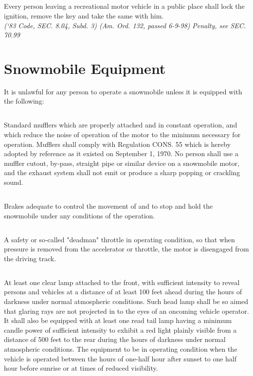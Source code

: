 \subsection{}
Every person leaving a recreational motor vehicle in a public place shall lock the ignition, remove the key and take the same with him.\\
\emph{(‘83 Code, SEC. 8.04, Subd. 3) (Am. Ord. 132, passed 6-9-98)}
\emph{Penalty, see SEC. 70.99}
\section{Snowmobile Equipment}
It is unlawful for any person to operate a snowmobile unless it is equipped with the following:
\subsection{}
Standard mufflers which are properly attached and in constant operation, and which reduce the noise of operation of the motor to the minimum necessary for operation. Mufflers shall comply with Regulation CONS. 55 which is hereby adopted by reference as it existed on September 1, 1970. No person shall use a muffler cut­out, by‑pass, straight pipe or similar device on a snowmobile motor, and the exhaust system shall not emit or produce a sharp popping or crackling sound.
\subsection{}
Brakes adequate to control the movement of and to stop and hold the snowmobile under any conditions of the operation.
\subsection{}
A safety or so‑called "deadman" throttle in operating condition, so that when pressure is removed from the accelerator or throttle, the motor is disengaged from the driving track.
\subsection{}
At least one clear lamp attached to the front, with sufficient intensity to reveal persons and vehicles at a distance of at least 100 feet ahead during the hours of darkness under normal atmospheric conditions. Such head lamp shall be so aimed that glaring rays are not projected in to the eyes of an oncoming vehicle operator. It shall also be equipped with at least one read tail lamp having a minimum candle power of sufficient intensity to exhibit a red light plainly visible from a distance of 500 feet to the rear during the hours of darkness under normal atmospheric conditions. The equipment to be in operating condition when the vehicle is operated between the hours of one-half hour after sunset to one half hour before sunrise or at times of reduced visibility.
